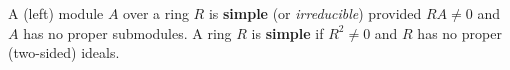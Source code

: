 A (left) module $A$ over a ring $R$ is \textbf{simple} (or \textit{irreducible}) provided $RA \neq 0$ and $A$ has no proper submodules. A ring $R$ is \textbf{simple} if $R^2 \neq 0$ and $R$ has no proper (two-sided) ideals.

